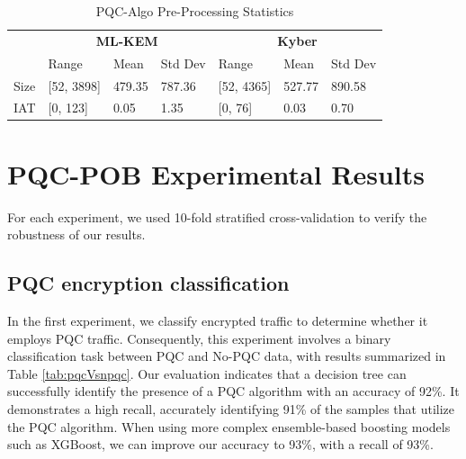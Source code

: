 \documentclass[10pt,journal]{IEEEtran}%
\begin{document}
\begin{table}[] \caption{PQC-Algo Pre-Processing Statistics} \label{tab:pqc-algo-proc-stats} \centering \begin{tabular}{l|lll|lll|} \cline{2-7} & \multicolumn{3}{c|}{\textbf{ML-KEM}} & \multicolumn{3}{c|}{\textbf{Kyber}} \\ \cline{2-7} & \multicolumn{1}{l|}{Range} & \multicolumn{1}{l|}{Mean} & Std Dev & \multicolumn{1}{l|}{Range} & \multicolumn{1}{l|}{Mean} & Std Dev \\ \hline \multicolumn{1}{|l|}{Size} & \multicolumn{1}{l|}{{[}52, 3898{]}} & \multicolumn{1}{l|}{479.35} & 787.36 & \multicolumn{1}{l|}{{[}52, 4365{]}} & \multicolumn{1}{l|}{527.77} & 890.58 \\ \hline \multicolumn{1}{|l|}{IAT} & \multicolumn{1}{l|}{{[}0, 123{]}} & \multicolumn{1}{l|}{0.05} & 1.35 & \multicolumn{1}{l|}{{[}0, 76{]}} & \multicolumn{1}{l|}{0.03} & 0.70 \\ \hline \end{tabular} \end{table}

\section{PQC-POB Experimental Results}
\label{sec:pobex}
For each experiment, we used 10-fold stratified cross-validation to verify the robustness of our results.

\subsection{PQC encryption classification} In the first experiment, we classify encrypted traffic to determine whether it employs PQC traffic. Consequently, this experiment involves a binary classification task between PQC and No-PQC data, with results summarized in Table \ref{tab:pqcVsnpqc}. Our evaluation indicates that a decision tree can successfully identify the presence of a PQC algorithm with an accuracy of 92\%. It demonstrates a high recall, accurately identifying 91\% of the samples that utilize the PQC algorithm. When using more complex ensemble-based boosting models such as XGBoost, we can improve our accuracy to 93\%, with a recall of 93\%.
\end{document}
